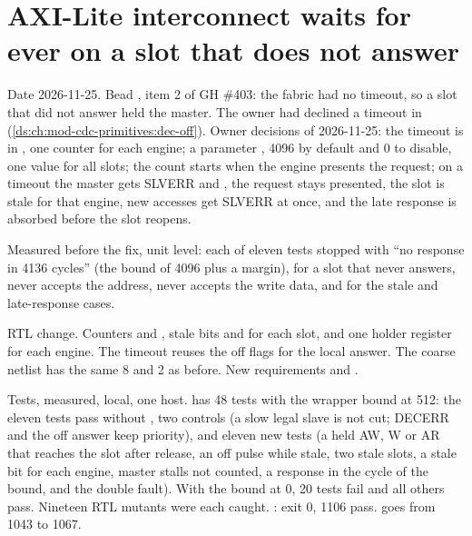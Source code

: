 \section{AXI-Lite interconnect waits for ever on a slot that does not answer}\label{cr:defect:fabric-timeout}

\begin{record}

Date 2026-11-25. Bead , item 2 of GH \#403: the fabric had no timeout, so a slot that did not answer held the master. The owner had declined a timeout in  (\cref{ds:ch:mod-cdc-primitives:dec-off}). Owner decisions of 2026-11-25: the timeout is in , one counter for each engine; a parameter , 4096 by default and 0 to disable, one value for all slots; the count starts when the engine presents the request; on a timeout the master gets SLVERR and , the request stays presented, the slot is stale for that engine, new accesses get SLVERR at once, and the late response is absorbed before the slot reopens.

\end{record}

\begin{record}

Measured before the fix, unit level: each of eleven tests stopped with ``no response in 4136 cycles'' (the bound of 4096 plus a margin), for a slot that never answers, never accepts the address, never accepts the write data, and for the stale and late-response cases.

\end{record}

\begin{record}

RTL change. Counters  and , stale bits  and  for each slot, and one holder register for each engine. The timeout reuses the off flags for the local answer. The coarse netlist has the same 8  and 2  as before. New requirements  and .

\end{record}

\begin{record}

Tests, measured, local, one host.  has 48 tests with the wrapper bound at 512: the eleven tests pass without , two controls (a slow legal slave is not cut; DECERR and the off answer keep priority), and eleven new tests (a held AW, W or AR that reaches the slot after release, an off pulse while stale, two stale slots, a stale bit for each engine, master stalls not counted, a response in the cycle of the bound, and the double fault). With the bound at 0, 20 tests fail and all others pass. Nineteen RTL mutants were each caught. : exit 0, 1106 pass.  goes from 1043 to 1067.

\end{record}

